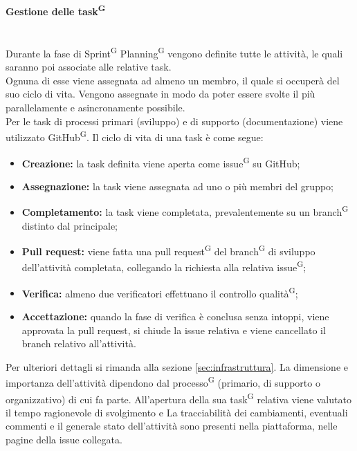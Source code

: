 \documentclass[8pt]{article}
\newcommand{\glossterm}[1]{#1\textsuperscript{G}} %
\newcommand{\subsubsubsection}[1]{\paragraph{#1}\mbox{}\\}
\begin{document}
\subsubsubsection{Gestione delle \glossterm{task}} \label{sec:gestione_task}
Durante la fase di \glossterm{Sprint} \glossterm{Planning} vengono definite tutte le attività, le quali saranno poi associate alle relative task.\\
Ognuna di esse viene assegnata ad almeno un membro, il quale si occuperà del suo ciclo di vita. Vengono assegnate in modo da poter essere svolte il più parallelamente e asincronamente possibile.\\
Per le task di processi primari (sviluppo) e di supporto (documentazione) viene utilizzato \glossterm{GitHub}.
Il ciclo di vita di una task è come segue:
\begin{itemize}
    \item \textbf{Creazione:} la task definita viene aperta come \glossterm{issue} su GitHub;
    \item \textbf{Assegnazione:} la task viene assegnata ad uno o più membri del gruppo;
    \item \textbf{Completamento:} la task viene completata, prevalentemente su un \glossterm{branch} distinto
      dal principale;
  \item \textbf{Pull request:} viene fatta una \glossterm{pull request} del \glossterm{branch} di sviluppo
      dell'attività completata, collegando la richiesta alla relativa \glossterm{issue};
  \item \textbf{Verifica:} almeno due verificatori effettuano il controllo \glossterm{qualità};
  \item \textbf{Accettazione:} quando la fase di verifica è conclusa senza intoppi, viene approvata la pull request, si chiude la issue relativa e viene cancellato il branch relativo all'attività.
\end{itemize}
Per ulteriori dettagli si rimanda alla sezione \hypersetup{hidelinks}\ref{sec:infrastruttura}. La dimensione e importanza
dell'attività dipendono dal \glossterm{processo} (primario, di supporto o organizzativo) di cui fa parte.
All'apertura della sua \glossterm{task} relativa viene valutato il tempo ragionevole di svolgimento e 
La tracciabilità dei cambiamenti, eventuali commenti e il generale stato dell'attività sono presenti nella piattaforma, nelle pagine della issue collegata.
\end{document}
